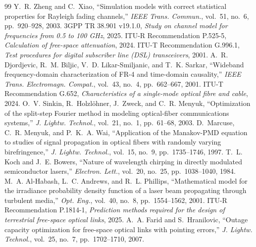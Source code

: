 \begin{thebibliography}{99}
 Y.~R. Zheng and C.~Xiao, ``Simulation models with correct statistical properties for Rayleigh fading channels,'' \emph{IEEE Trans. Commun.}, vol.~51, no.~6, pp.~920--928, 2003.
 3GPP TR 38.901 v19.1.0, \emph{Study on channel model for frequencies from 0.5 to 100 GHz}, 2025.
 ITU-R Recommendation P.525-5, \emph{Calculation of free-space attenuation}, 2024.
 ITU-T Recommendation G.996.1, \emph{Test procedures for digital subscriber line (DSL) transceivers}, 2001.
 A.~R. Djordjevic, R.~M. Biljic, V.~D. Likar-Smiljanic, and T.~K. Sarkar, ``Wideband frequency-domain characterization of FR-4 and time-domain causality,'' \emph{IEEE Trans. Electromagn. Compat.}, vol.~43, no.~4, pp.~662--667, 2001.
 ITU-T Recommendation G.652, \emph{Characteristics of a single-mode optical fibre and cable}, 2024.
 O.~V. Sinkin, R.~Holzlöhner, J.~Zweck, and C.~R. Menyuk, ``Optimization of the split-step Fourier method in modeling optical-fiber communications systems,'' \emph{J. Lightw. Technol.}, vol.~21, no.~1, pp.~61--68, 2003.
 D.~Marcuse, C.~R. Menyuk, and P.~K.~A. Wai, ``Application of the Manakov-PMD equation to studies of signal propagation in optical fibers with randomly varying birefringence,'' \emph{J. Lightw. Technol.}, vol.~15, no.~9, pp.~1735--1746, 1997.
 T.~L. Koch and J.~E. Bowers, ``Nature of wavelength chirping in directly modulated semiconductor lasers,'' \emph{Electron. Lett.}, vol.~20, no.~25, pp.~1038--1040, 1984.
 M.~A. Al-Habash, L.~C. Andrews, and R.~L. Phillips, ``Mathematical model for the irradiance probability density function of a laser beam propagating through turbulent media,'' \emph{Opt. Eng.}, vol.~40, no.~8, pp.~1554--1562, 2001.
 ITU-R Recommendation P.1814-1, \emph{Prediction methods required for the design of terrestrial free-space optical links}, 2025.
 A.~A. Farid and S.~Hranilovic, ``Outage capacity optimization for free-space optical links with pointing errors,'' \emph{J. Lightw. Technol.}, vol.~25, no.~7, pp.~1702--1710, 2007.


\end{thebibliography}
